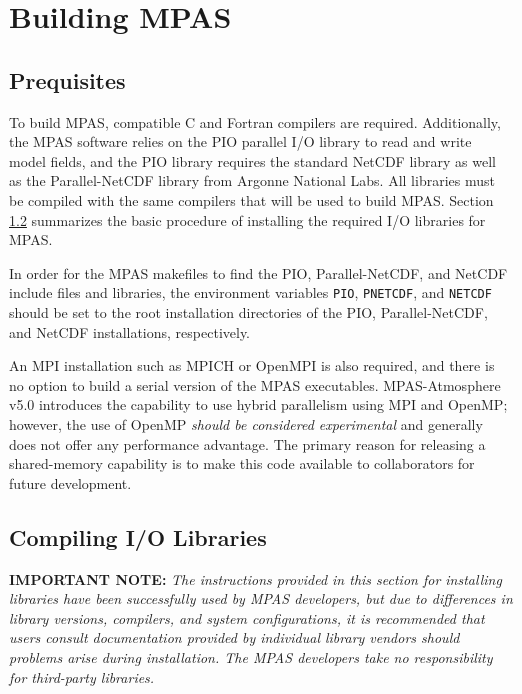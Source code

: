 \chapter{Building MPAS}
\label{chap:mpas_build_instructions}

\section{Prequisites}
\label{build_prerequisites}

To build MPAS, compatible C and Fortran compilers are required. Additionally,
the MPAS software relies on the PIO parallel I/O library to read and write model
fields, and the PIO library requires the standard NetCDF library as well as the
Parallel-NetCDF library from Argonne National Labs. All libraries must be
compiled with the same compilers that will be used to build MPAS. Section
\ref{sec:build_io} summarizes the basic procedure of installing the required I/O
libraries for MPAS.

In order for the MPAS makefiles to find the PIO, Parallel-NetCDF, and NetCDF
include files and libraries, the environment variables {\tt PIO}, {\tt PNETCDF},
and {\tt NETCDF} should be set to the root installation directories of the PIO,
Parallel-NetCDF, and NetCDF installations, respectively. 

An MPI installation such as MPICH or OpenMPI is also required, and there is no
option to build a serial version of the MPAS executables. MPAS-Atmosphere v5.0
introduces the capability to use hybrid parallelism using MPI and OpenMP; however,
the use of OpenMP {\em should be considered experimental} and generally does not
offer any performance advantage. The primary reason for releasing a shared-memory
capability is to make this code available to collaborators for future development.


\section{Compiling I/O Libraries}
\label{sec:build_io}

{\bf IMPORTANT NOTE:} {\em The instructions provided in this section for
installing libraries have been successfully used by MPAS developers, but due to
differences in library versions, compilers, and system configurations, it is
recommended that users consult documentation provided by individual library
vendors should problems arise during installation. The MPAS developers take no
responsibility for third-party libraries.} \vspace{12pt}

